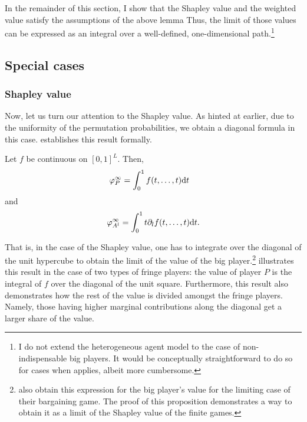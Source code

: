 In the remainder of this section, I show that the Shapley value and the weighted value satisfy the assumptions of the above lemma
Thus, the limit of those values can be expressed as an integral over a well-defined, one-dimensional path.\footnote{
    I do not extend the heterogeneous agent model to the case of non-indispensable big players.
    It would be conceptually straightforward to do so for cases when  applies, albeit more cumbersome.
}

\subsection{Special cases}
\subsubsection{Shapley value}

Now, let us turn our attention to the Shapley value.
As hinted at earlier, due to the uniformity of the permutation probabilities, we obtain a diagonal formula in this case.
 establishes this result formally.

\begin{proposition}
    \label{prop:many_sided_shapley}
    Let $f$ be continuous on $[0, 1]^L$.
    Then,
    \begin{align*}
        \varphi_P^\infty & = \int_0^1 f(t, \dots, t) \mathrm{d}t
    \end{align*}
    and
    \begin{align*}
        \varphi_{A^l}^\infty = \int_0^1 t \partial_l f(t, \dots, t) \mathrm{d}t.
    \end{align*}
\end{proposition}
That is, in the case of the Shapley value, one has to integrate over the diagonal of the unit hypercube to obtain the limit of the value of the big player.\footnote{
    \textcite{stole1996intra} also obtain this expression for the big player's value for the limiting case of their bargaining game.
    The proof of this proposition demonstrates a way to obtain it as a limit of the Shapley value of the finite games.
}
 illustrates this result in the case of two types of fringe players: the value of player $P$ is the integral of $f$ over the diagonal of the unit square.
Furthermore, this result also demonstrates how the rest of the value is divided amongst the fringe players.
Namely, those having higher marginal contributions along the diagonal get a larger share of the value.

